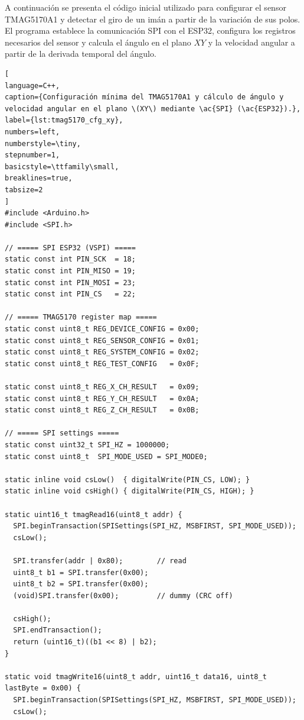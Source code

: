 A continuación se presenta el código inicial utilizado para configurar el sensor TMAG5170A1 y detectar el giro de un imán a partir de la variación de sus polos. El programa establece la comunicación \ac{SPI} con el ESP32, configura los registros necesarios del sensor y calcula el ángulo en el plano \(XY\) y la velocidad angular a partir de la derivada temporal del ángulo.


\begin{lstlisting}[
language=C++,
caption={Configuración mínima del TMAG5170A1 y cálculo de ángulo y velocidad angular en el plano \(XY\) mediante \ac{SPI} (\ac{ESP32}).},
label={lst:tmag5170_cfg_xy},
numbers=left,
numberstyle=\tiny,
stepnumber=1,
basicstyle=\ttfamily\small,
breaklines=true,
tabsize=2
]
#include <Arduino.h>
#include <SPI.h>

// ===== SPI ESP32 (VSPI) =====
static const int PIN_SCK  = 18;
static const int PIN_MISO = 19;
static const int PIN_MOSI = 23;
static const int PIN_CS   = 22;

// ===== TMAG5170 register map =====
static const uint8_t REG_DEVICE_CONFIG = 0x00;
static const uint8_t REG_SENSOR_CONFIG = 0x01;
static const uint8_t REG_SYSTEM_CONFIG = 0x02;
static const uint8_t REG_TEST_CONFIG   = 0x0F;

static const uint8_t REG_X_CH_RESULT   = 0x09;
static const uint8_t REG_Y_CH_RESULT   = 0x0A;
static const uint8_t REG_Z_CH_RESULT   = 0x0B;

// ===== SPI settings =====
static const uint32_t SPI_HZ = 1000000;
static const uint8_t  SPI_MODE_USED = SPI_MODE0;

static inline void csLow()  { digitalWrite(PIN_CS, LOW); }
static inline void csHigh() { digitalWrite(PIN_CS, HIGH); }

static uint16_t tmagRead16(uint8_t addr) {
  SPI.beginTransaction(SPISettings(SPI_HZ, MSBFIRST, SPI_MODE_USED));
  csLow();

  SPI.transfer(addr | 0x80);        // read
  uint8_t b1 = SPI.transfer(0x00);
  uint8_t b2 = SPI.transfer(0x00);
  (void)SPI.transfer(0x00);         // dummy (CRC off)

  csHigh();
  SPI.endTransaction();
  return (uint16_t)((b1 << 8) | b2);
}

static void tmagWrite16(uint8_t addr, uint16_t data16, uint8_t lastByte = 0x00) {
  SPI.beginTransaction(SPISettings(SPI_HZ, MSBFIRST, SPI_MODE_USED));
  csLow();


\end{lstlisting}
